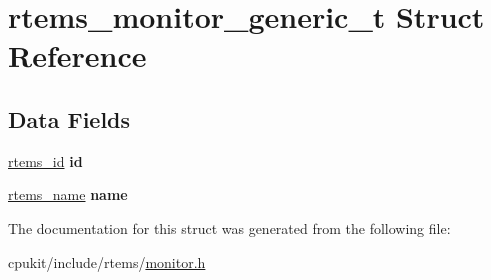 \hypertarget{structrtems__monitor__generic__t}{}\section{rtems\+\_\+monitor\+\_\+generic\+\_\+t Struct Reference}
\label{structrtems__monitor__generic__t}
\subsection*{Data Fields}
\begin{DoxyCompactItemize}
\item 
\mbox{\label{structrtems__monitor__generic__t_ab78e3bfce481c83805c3f88b1fbe9c63}} 
\mbox{\hyperlink{group__ClassicTasks_gab20892b814dced7dd4e5b9bf42becd57}{rtems\+\_\+id}} {\bfseries id}
\item 
\mbox{\label{structrtems__monitor__generic__t_a6ec98f04a1c500f820c02417ff67e3ba}} 
\mbox{\hyperlink{group__ClassicTasks_ga55fb63c49f68c0cbd9bee004da15b1fd}{rtems\+\_\+name}} {\bfseries name}
\end{DoxyCompactItemize}


The documentation for this struct was generated from the following file\+:\begin{DoxyCompactItemize}
\item 
cpukit/include/rtems/\mbox{\hyperlink{monitor_8h}{monitor.\+h}}\end{DoxyCompactItemize}

